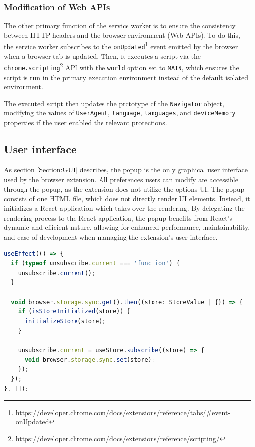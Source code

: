 \subsubsection{Modification of Web APIs}
\label{SubSubSection:APIModifications}

The other primary function of the service worker is to ensure the consistency between HTTP headers and the browser environment (Web APIs). To do this, the service worker subscribes to the \texttt{onUpdated}\footnote{\url{https://developer.chrome.com/docs/extensions/reference/tabs/\#event-onUpdated}} event emitted by the browser when a browser tab is updated. Then, it executes a script via the \texttt{chrome.scripting}\footnote{\url{https://developer.chrome.com/docs/extensions/reference/scripting/}} API with the \texttt{world} option set to \texttt{MAIN}, which ensures the script is run in the primary execution environment instead of the default isolated environment.

The executed script then updates the prototype of the \texttt{Navigator} object, modifying the values of \texttt{UserAgent}, \texttt{language}, \texttt{languages}, and \texttt{deviceMemory} properties if the user enabled the relevant protections.

\subsection{User interface}

As section \ref{Section:GUI} describes, the popup is the only graphical user interface used by the browser extension. All preferences users can modify are accessible through the popup, as the extension does not utilize the options UI. The popup consists of one HTML file, which does not directly render UI elements. Instead, it initializes a React application which takes over the rendering. By delegating the rendering process to the React application, the popup benefits from React's dynamic and efficient nature, allowing for enhanced performance, maintainability, and ease of development when managing the extension's user interface.

\bigbreak

\begin{lstlisting}[language={TypeScript}, caption={A code snippet in which the React application initializes its storage and creates a subscription for future changes.}]
useEffect(() => {
  if (typeof unsubscribe.current === 'function') {
    unsubscribe.current();
  }

  void browser.storage.sync.get().then((store: StoreValue | {}) => {
    if (isStoreInitialized(store)) {
      initializeStore(store);
    }

    unsubscribe.current = useStore.subscribe((store) => {
      void browser.storage.sync.set(store);
    });
  });
}, []);
\end{lstlisting}

